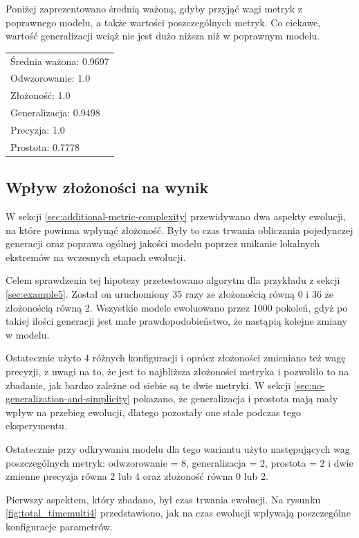 Poniżej zaprezentowano średnią ważoną, gdyby przyjąć wagi metryk z poprawnego modelu, a także wartości poszczególnych metryk. Co ciekawe, wartość generalizacji wciąż nie jest dużo niższa niż w poprawnym modelu.
 
 \begin{center}
  \begin{tabular}{l}
	Średnia ważona: 0.9697 \\
	Odwzorowanie: 1.0 \\
	Złożoność: 1.0 \\
	Generalizacja: 0.9498 \\
	Precyzja: 1.0 \\
	Prostota: 0.7778
  \end{tabular}
 \end{center}

\subsection{Wpływ złożoności na wynik}
W sekcji \ref{sec:additional-metric-complexity} przewidywano dwa aspekty ewolucji, na które powinna wpłynąć złożoność. Były to czas trwania obliczania pojedynczej generacji oraz poprawa ogólnej jakości modelu poprzez unikanie lokalnych ekstremów na wczesnych etapach ewolucji. 

Celem sprawdzenia tej hipotezy przetestowano algorytm dla przykładu z sekcji \ref{sec:example5}. Został on  uruchomiony 35 razy ze złożonością równą 0 i 36 ze złożonością równą 2. Wszystkie modele ewoluowano przez 1000 pokoleń, gdyż po takiej ilości generacji jest małe prawdopodobieństwo, że nastąpią kolejne zmiany w modelu. 

Ostatecznie użyto 4 różnych konfiguracji i oprócz złożoności zmieniano też wagę precyzji, z uwagi na to, że jest to najbliższa złożoności metryka i pozwoliło to na zbadanie, jak bardzo zależne od siebie są te dwie metryki. W sekcji \ref{sec:no-generalization-and-simplicity} pokazano, że generalizacja i prostota mają mały wpływ na przebieg ewolucji, dlatego pozostały one stałe podczas tego eksperymentu.

Ostatecznie przy odkrywaniu modelu dla tego wariantu użyto następujących wag poszczególnych metryk: odwzorowanie = 8, generalizacja = 2, prostota = 2 i dwie zmienne precyzja równa 2 lub 4 oraz złożoność równa 0 lub 2. 

Pierwszy aspektem, który zbadano, był czas trwania ewolucji. Na rysunku \ref{fig:total_timemulti4} przedstawiono, jak na czas ewolucji wpływają poszczególne konfiguracje parametrów.  

